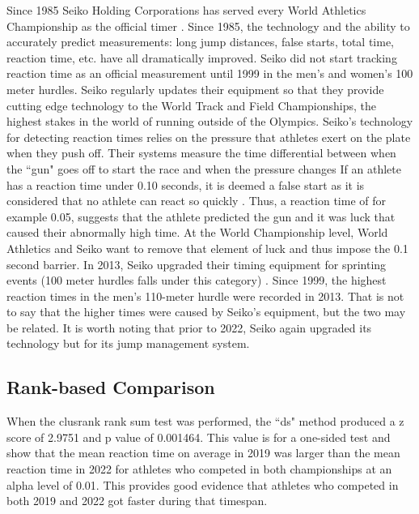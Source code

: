 \documentclass[12pt, letterpaper, titlepage]{article}
\begin{document}

Since 1985 Seiko Holding Corporations has served every World Athletics Championship
as the official timer \citep{wa2022seiko}.  Since 1985, the technology and the ability
to accurately predict measurements: long jump distances, false starts, total time,
reaction time, etc. have all dramatically improved.  Seiko did not start tracking
reaction time as an official measurement until 1999 in the men's and women's 100 meter
hurdles.  Seiko regularly updates their equipment so that they provide cutting edge
technology to the World Track and Field Championships, the highest stakes in the world
of running outside of the Olympics. Seiko's technology for detecting reaction 
times relies on the pressure that athletes
exert on the plate when they push off.  Their systems measure the time differential
between when the ``gun" goes off to start the race and when the pressure changes 
\citep{wa2022seiko}  If an athlete has a reaction time under 0.10 seconds, it is deemed a 
false start as it is considered that no athlete can react so quickly 
\citep{Seiko-Timing}.  Thus, a reaction time of for example 0.05, suggests that 
the athlete predicted the gun and it was luck that caused their abnormally high 
time.  At the World Championship level, World Athletics and Seiko want to remove 
that element of luck and thus impose the 0.1 second barrier. In 2013, Seiko 
upgraded their timing equipment for sprinting events (100 meter hurdles falls 
under this category) \citep{wa2013backtage}.  Since 1999, the highest reaction 
times in the men's 110-meter hurdle were recorded in 2013.  That is not to say that the higher 
times were caused by Seiko's equipment, but the two may be related.  It is worth noting that prior
to 2022, Seiko again upgraded its technology but for its jump management system.


\subsection{Rank-based Comparison} \label{subsec:Results_Rank}


When the clusrank rank sum test was performed, the ``ds" method produced a z score of
2.9751 and p value of 0.001464.  This value is for a one-sided test and show that
the mean reaction time on average in 2019 was larger than the mean reaction time
in 2022 for athletes who competed in both championships at an alpha level of 0.01.
This provides good evidence that athletes who competed in both 2019 and 2022 got
faster during that timespan.
\end{document}
